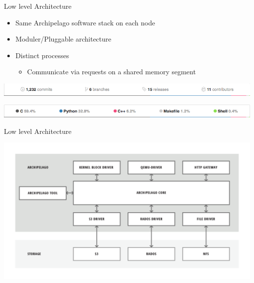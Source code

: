 \documentclass[utf8]{beamer}
\begin{document}
\begin{frame}{Low level Architecture}
 \begin{itemize}
  \item Same Archipelago software stack on each node
  \item Moduler/Pluggable architecture
  \item Distinct processes
    \begin{itemize}
      \item Communicate via requests on a shared memory segment
    \end{itemize}
  \end{itemize}

  \begin{center}
    \includegraphics[width=.90\linewidth]{figures/archipelago-activity.png}
  \end{center}
  \begin{center}
    \includegraphics[width=.90\linewidth]{figures/archipelago-language-stats.png}
  \end{center}
\end{frame}

\begin{frame}{Low level Architecture}
  \begin{center}
    \includegraphics[width=.90\linewidth]{figures/low-architecture.png}
  \end{center}
\end{frame}
\end{document}
